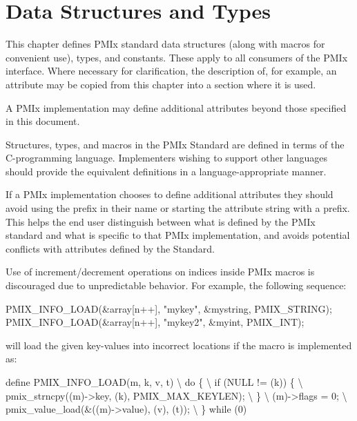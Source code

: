 \chapter{Data Structures and Types}
\label{chap:struct}

This chapter defines \ac{PMIx} standard data structures (along with macros for convenient use), types, and constants.
These apply to all consumers of the \ac{PMIx} interface.
Where necessary for clarification, the description of, for example, an attribute may be copied from this chapter into a section where it is used.

A PMIx implementation may define additional attributes beyond those specified in this document.

\adviceimplstart
Structures, types, and macros in the \ac{PMIx} Standard are defined in terms of the C-programming language. Implementers wishing to support other languages should provide the equivalent definitions in a language-appropriate manner.

If a PMIx implementation chooses to define additional attributes they should avoid using the  prefix in their name or starting the attribute string with a  prefix.
This helps the end user distinguish between what is defined by the PMIx standard and what is specific to that PMIx implementation, and avoids potential conflicts with attributes defined by the Standard.
\adviceimplend

\adviceuserstart
Use of increment/decrement operations on indices inside \ac{PMIx} macros is discouraged due to unpredictable behavior. For example, the following sequence:

\begin{codepar}
PMIX_INFO_LOAD(&array[n++], "mykey", &mystring, PMIX_STRING);
PMIX_INFO_LOAD(&array[n++], "mykey2", &myint, PMIX_INT);
\end{codepar}

will load the given key-values into incorrect locations if the macro is implemented as:

\begin{codepar}
define PMIX_INFO_LOAD(m, k, v, t)                      \textbackslash
  do \{                                                 \textbackslash
    if (NULL != (k)) \{                                 \textbackslash
      pmix_strncpy((m)->key, (k), PMIX_MAX_KEYLEN);    \textbackslash
    \}                                                  \textbackslash
    (m)->flags = 0;                                    \textbackslash
    pmix_value_load(&((m)->value), (v), (t));          \textbackslash
  \} while (0)
\end{codepar}

